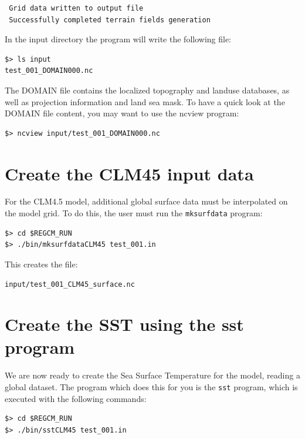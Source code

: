 \begin{Verbatim}
 Grid data written to output file                                               
 Successfully completed terrain fields generation
\end{Verbatim}

In the input directory the program will write the following file:

\begin{Verbatim}
$> ls input
test_001_DOMAIN000.nc
\end{Verbatim}

The DOMAIN file contains the localized topography and landuse databases, as
well as projection information and land sea mask. To have a quick look at the
DOMAIN file content, you may
want to use the ncview program:

\begin{Verbatim}
$> ncview input/test_001_DOMAIN000.nc
\end{Verbatim}

\section{Create the CLM45 input data}

For the CLM4.5 model, additional global surface data must be interpolated on
the model grid. To do this, the user must run the \verb=mksurfdata= program:

\begin{Verbatim}
$> cd $REGCM_RUN
$> ./bin/mksurfdataCLM45 test_001.in
\end{Verbatim}

This creates the file:

\begin{Verbatim}
input/test_001_CLM45_surface.nc
\end{Verbatim}

\section{Create the SST using the sst program}

We are now ready to create the Sea Surface Temperature for the model, reading
a global dataset.
The program which does this for you is the \verb=sst= program, which is
executed with the following commands:

\begin{Verbatim}
$> cd $REGCM_RUN
$> ./bin/sstCLM45 test_001.in
\end{Verbatim}

